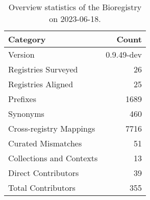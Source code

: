 \begin{table}
\caption{Overview statistics of the Bioregistry on 2023-06-18.}
\label{tab:bioregistry-summary}
\begin{tabular}{lr}
\toprule
Category & Count \\
\midrule
Version & 0.9.49-dev \\
Registries Surveyed & 26 \\
Registries Aligned & 25 \\
Prefixes & 1689 \\
Synonyms & 460 \\
Cross-registry Mappings & 7716 \\
Curated Mismatches & 51 \\
Collections and Contexts & 13 \\
Direct Contributors & 39 \\
Total Contributors & 355 \\
\bottomrule
\end{tabular}
\end{table}
